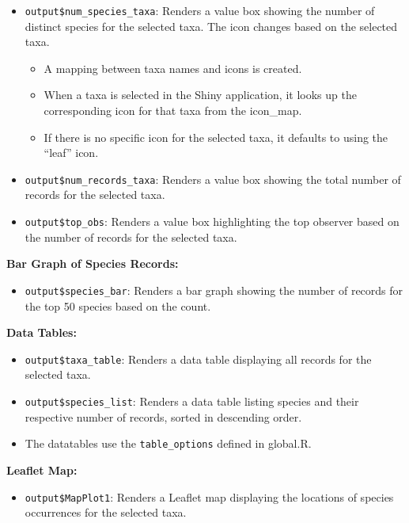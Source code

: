 \documentclass[
]{book}
\providecommand{\tightlist}{%
  \setlength{\itemsep}{0pt}\setlength{\parskip}{0pt}}
\begin{document}
\begin{itemize}
\item
  \texttt{output\$num\_species\_taxa}: Renders a value box showing the number of distinct species for the selected taxa. The icon changes based on the selected taxa.

  \begin{itemize}
  \tightlist
  \item
    A mapping between taxa names and icons is created.
  \item
    When a taxa is selected in the Shiny application, it looks up the corresponding icon for that taxa from the icon\_map.
  \item
    If there is no specific icon for the selected taxa, it defaults to using the ``leaf'' icon.
  \end{itemize}
\item
  \texttt{output\$num\_records\_taxa}: Renders a value box showing the total number of records for the selected taxa.
\item
  \texttt{output\$top\_obs}: Renders a value box highlighting the top observer based on the number of records for the selected taxa.
\end{itemize}

\textbf{Bar Graph of Species Records:}

\begin{itemize}
\tightlist
\item
  \texttt{output\$species\_bar}: Renders a bar graph showing the number of records for the top 50 species based on the count.
\end{itemize}

\textbf{Data Tables:}

\begin{itemize}
\item
  \texttt{output\$taxa\_table}: Renders a data table displaying all records for the selected taxa.
\item
  \texttt{output\$species\_list}: Renders a data table listing species and their respective number of records, sorted in descending order.
\item
  The datatables use the \texttt{table\_options} defined in global.R.
\end{itemize}

\textbf{Leaflet Map:}

\begin{itemize}
\tightlist
\item
  \texttt{output\$MapPlot1}: Renders a Leaflet map displaying the locations of species occurrences for the selected taxa.
\end{itemize}
\end{document}
